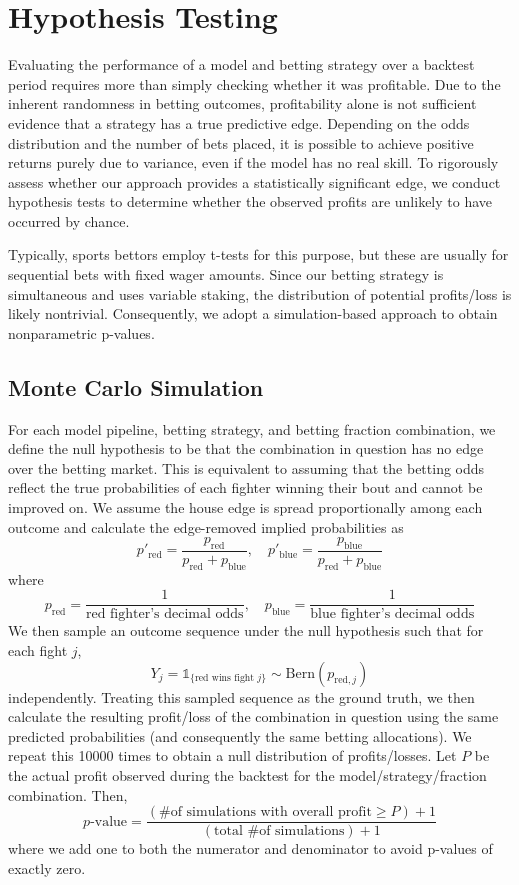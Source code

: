 \documentclass[12pt,twoside]{report}
\begin{document}
\section{Hypothesis Testing}

Evaluating the performance of a model and betting strategy over a backtest period requires more than simply checking whether it was profitable. Due to the inherent randomness in betting outcomes, profitability alone is not sufficient evidence that a strategy has a true predictive edge. Depending on the odds distribution and the number of bets placed, it is possible to achieve positive returns purely due to variance, even if the model has no real skill. To rigorously assess whether our approach provides a statistically significant edge, we conduct hypothesis tests to determine whether the observed profits are unlikely to have occurred by chance.

Typically, sports bettors employ t-tests for this purpose, but these are usually for sequential bets with fixed wager amounts. Since our betting strategy is simultaneous and uses variable staking, the distribution of potential profits/loss is likely nontrivial. Consequently, we adopt a simulation-based approach to obtain nonparametric p-values.

\subsection{Monte Carlo Simulation}

For each model pipeline, betting strategy, and betting fraction combination, we define the null hypothesis to be that the combination in question has no edge over the betting market. This is equivalent to assuming that the betting odds reflect the true probabilities of each fighter winning their bout and cannot be improved on. We assume the house edge is spread proportionally among each outcome and calculate the edge-removed implied probabilities as
$$p'_{\text{red}} = \frac{p_{\text{red}}}{p_{\text{red}} + p_{\text{blue}}}, \quad p'_{\text{blue}} = \frac{p_{\text{blue}}}{p_{\text{red}} + p_{\text{blue}}}$$
where
$$p_{\text{red}} = \frac{1}{\text{red fighter's decimal odds}}, \quad p_{\text{blue}} = \frac{1}{\text{blue fighter's decimal odds}}$$
We then sample an outcome sequence under the null hypothesis such that for each fight $j$,
$$Y_j = \mathds{1}_{\{\text{red wins fight } j\}} \sim \text{Bern}(p_{\text{red}, j})$$
independently. Treating this sampled sequence as the ground truth, we then calculate the resulting profit/loss of the combination in question using the same predicted probabilities (and consequently the same betting allocations). We repeat this 10000 times to obtain a null distribution of profits/losses. Let $P$ be the actual profit observed during the backtest for the model/strategy/fraction combination. Then,
$$p\text{-value} = \frac{(\text{\# of simulations with overall profit} \geq P) + 1}{(\text{total \# of simulations}) + 1}$$
where we add one to both the numerator and denominator to avoid p-values of exactly zero. 
\end{document}
